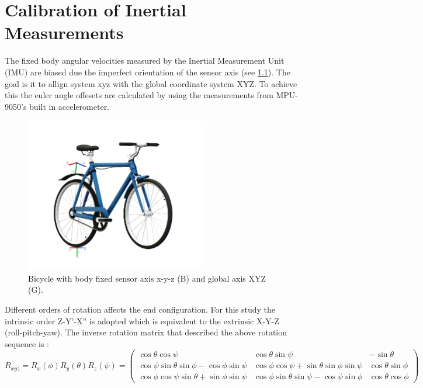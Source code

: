 
\chapter{Calibration of Inertial Measurements} \label{app:A}

The fixed body angular velocities measured by the Inertial Measurement Unit (IMU) are biased due the imperfect orientation of the sensor axis (see \cref{fig:bike_imu}). The goal is  it to allign system xyz with the global coordinate system XYZ. To achieve this the euler angle offesets are calculated by using the measurements from MPU-9050's built in accelerometer. 

\begin{figure}[ht]
    \centering
    \includegraphics[width=0.7\textwidth]{images/whipple_axis.png}
    \caption{Bicycle with body fixed sensor axis x-y-z (B) and global axis XYZ (G). }
    \label{fig:bike_imu}
\end{figure}

Different orders of rotation affects the end configuration. For this study the intrinsic order Z-Y'-X'' is adopted which is equivalent to the extrinsic X-Y-Z (roll-pitch-yaw). The inverse rotation matrix that described the above rotation sequence is :
\begin{equation}
R_{xyz}=R_x(\phi)R_y(\theta)R_z(\psi)=\left(\begin{array}{ccc}{\cos \theta \cos \psi} & {\cos \theta \sin \psi} & {-\sin \theta} \\ {\cos \psi \sin \theta \sin \phi-\cos \phi \sin \psi} & {\cos \phi \cos \psi+\sin \theta \sin \phi \sin \psi} & {\cos \theta \sin \phi} \\ {\cos \phi \cos \psi \sin \theta+\sin \phi \sin \psi} & {\cos \phi \sin \theta \sin \psi-\cos \psi \sin \phi} & {\cos \theta \cos \phi}\end{array}\right)
\label{eq:rotmat2}
\end{equation}


